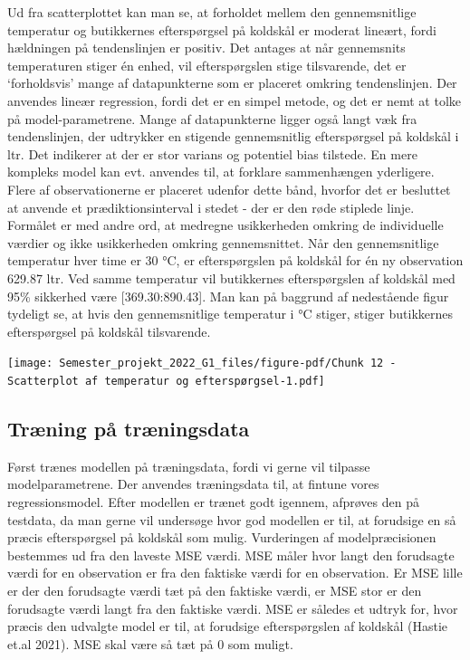 \documentclass[
  12pt,
  a4paper,
  DIV=11,
  numbers=noendperiod]{scrartcl}
\begin{document}
Ud fra scatterplottet kan man se, at forholdet mellem den gennemsnitlige
temperatur og butikkernes efterspørgsel på koldskål er moderat lineært,
fordi hældningen på tendenslinjen er positiv. Det antages at når
gennemsnits temperaturen stiger én enhed, vil efterspørgslen stige
tilsvarende, det er `forholdsvis' mange af datapunkterne som er placeret
omkring tendenslinjen. Der anvendes lineær regression, fordi det er en
simpel metode, og det er nemt at tolke på model-parametrene. Mange af
datapunkterne ligger også langt væk fra tendenslinjen, der udtrykker en
stigende gennemsnitlig efterspørgsel på koldskål i ltr. Det indikerer at
der er stor varians og potentiel bias tilstede. En mere kompleks model
kan evt. anvendes til, at forklare sammenhængen yderligere. Flere af
observationerne er placeret udenfor dette bånd, hvorfor det er besluttet
at anvende et prædiktionsinterval i stedet - der er den røde stiplede
linje. Formålet er med andre ord, at medregne usikkerheden omkring de
individuelle værdier og ikke usikkerheden omkring gennemsnittet. Når den
gennemsnitlige temperatur hver time er 30 °C, er efterspørgslen på
koldskål for én ny observation 629.87 ltr. Ved samme temperatur vil
butikkernes efterspørgslen af koldskål med 95\% sikkerhed være
{[}369.30:890.43{]}. Man kan på baggrund af nedestående figur tydeligt
se, at hvis den gennemsnitlige temperatur i °C stiger, stiger
butikkernes efterspørgsel på koldskål tilsvarende.

\texttt{[image: Semester\_projekt\_2022\_G1\_files/figure-pdf/Chunk 12 - Scatterplot af temperatur og efterspørgsel-1.pdf]}

\hypertarget{truxe6ning-puxe5-truxe6ningsdata}{%
\subsection{Træning på
træningsdata}\label{truxe6ning-puxe5-truxe6ningsdata}}

Først trænes modellen på træningsdata, fordi vi gerne vil tilpasse
modelparametrene. Der anvendes træningsdata til, at fintune vores
regressionsmodel. Efter modellen er trænet godt igennem, afprøves den på
testdata, da man gerne vil undersøge hvor god modellen er til, at
forudsige en så præcis efterspørgsel på koldskål som mulig. Vurderingen
af modelpræcisionen bestemmes ud fra den laveste MSE værdi. MSE måler
hvor langt den forudsagte værdi for en observation er fra den faktiske
værdi for en observation. Er MSE lille er der den forudsagte værdi tæt
på den faktiske værdi, er MSE stor er den forudsagte værdi langt fra den
faktiske værdi. MSE er således et udtryk for, hvor præcis den udvalgte
model er til, at forudsige efterspørgslen af koldskål (Hastie et.al
2021). MSE skal være så tæt på \(0\) som muligt.
\end{document}
